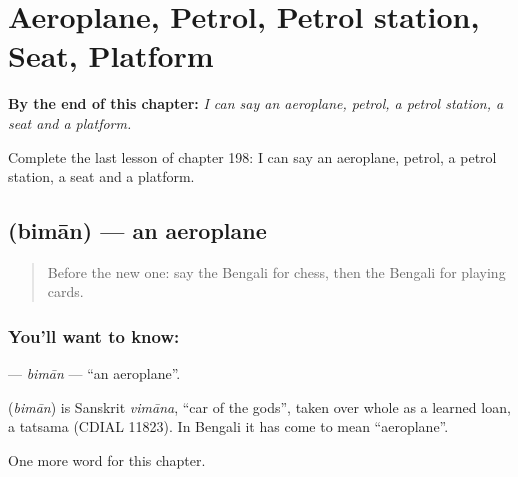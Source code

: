 
\chapter{Aeroplane, Petrol, Petrol station, Seat, Platform}
\label{ch:bn-aeroplane-petrol-petrol-station-seat-platform}

\begin{chapteropening}
\textbf{By the end of this chapter:} \emph{I can say an aeroplane, petrol, a petrol station, a seat and a platform.}

Complete the last lesson of chapter 198: I can say an aeroplane, petrol, a petrol station, a seat and a platform.
\end{chapteropening}

\section[\texorpdfstring{\bn{বিমান} (bimān)}{বিমান (bimān)}]{ (bimān) — an aeroplane}

\label{lesson:BN-C198-biman}



\begin{quote}
Before the new one: say the Bengali for chess, then the Bengali for playing cards.
\end{quote}

\subsection*{You'll want to know: }
\textbf{} — \emph{bimān} — \textquotedblleft{}an aeroplane\textquotedblright{}.

\begin{cousinweb}
\textbf{} (\emph{bimān}) is Sanskrit \emph{vimāna}, \textquotedblleft{}car of the gods\textquotedblright{}, taken over whole as a learned loan, a tatsama (CDIAL 11823). In Bengali it has come to mean \textquotedblleft{}aeroplane\textquotedblright{}.
\end{cousinweb}

\begin{grammarlens}[title={What you've built}]
One more word for this chapter.
\end{grammarlens}

